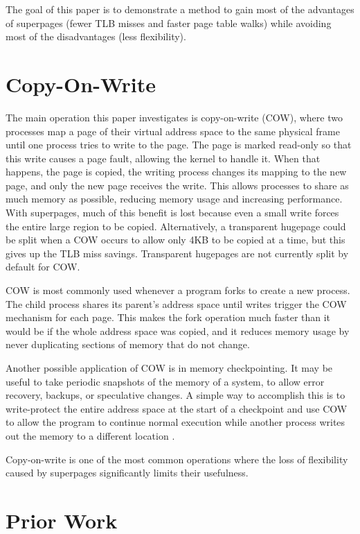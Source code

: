 The goal of this paper is to demonstrate a method to gain most of the advantages of superpages (fewer TLB misses and faster page table walks) while avoiding most of the disadvantages (less flexibility).

\section{Copy-On-Write}

The main operation this paper investigates is copy-on-write (COW), where two processes map a page of their virtual address space to the same physical frame until one process tries to write to the page. The page is marked read-only so that this write causes a page fault, allowing the kernel to handle it. When that happens, the page is copied, the writing process changes its mapping to the new page, and only the new page receives the write. This allows processes to share as much memory as possible, reducing memory usage and increasing performance. With superpages, much of this benefit is lost because even a small write forces the entire large region to be copied. Alternatively, a transparent hugepage could be split when a COW occurs to allow only 4KB to be copied at a time, but this gives up the TLB miss savings. Transparent hugepages are not currently split by default for COW.

COW is most commonly used whenever a program forks to create a new process. The child process shares its parent's address space until writes trigger the COW mechanism for each page. This makes the fork operation much faster than it would be if the whole address space was copied, and it reduces memory usage by never duplicating sections of memory that do not change.

Another possible application of COW is in memory checkpointing. It may be useful to take periodic snapshots of the memory of a system, to allow error recovery, backups, or speculative changes. A simple way to accomplish this is to write-protect the entire address space at the start of a checkpoint and use COW to allow the program to continue normal execution while another process writes out the memory to a different location \cite{Sun}.

Copy-on-write is one of the most common operations where the loss of flexibility caused by superpages significantly limits their usefulness.

\section{Prior Work}

